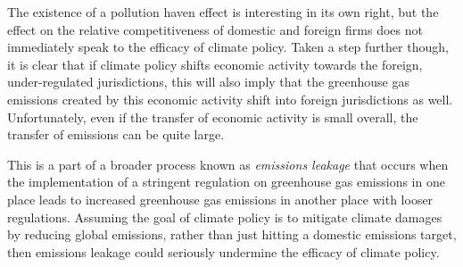  
The existence of a pollution haven effect is interesting in its own right, but the effect on the relative competitiveness of domestic and foreign firms does not immediately speak to the efficacy of climate policy. Taken a step further though, it is clear that if climate policy shifts economic activity towards the foreign, under-regulated jurisdictions, this will also imply that the greenhouse gas emissions created by this economic activity shift into foreign jurisdictions as well. Unfortunately, even if the transfer of economic activity is small overall, the transfer of emissions can be quite large.

This is a part of a broader process known as \emph{emissions leakage} that occurs when the implementation of a stringent regulation on greenhouse gas emissions in one place leads to increased greenhouse gas emissions in another place with looser regulations. Assuming the goal of climate policy is to mitigate climate damages by reducing global emissions, rather than just hitting a domestic emissions target, then emissions leakage could seriously undermine the efficacy of climate policy. 


